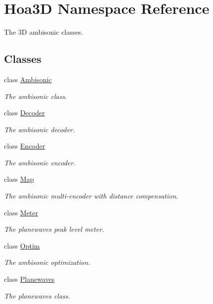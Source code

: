 \hypertarget{namespace_hoa3_d}{\section{Hoa3\-D Namespace Reference}
\label{namespace_hoa3_d}
}


The 3\-D ambisonic classes.  


\subsection*{Classes}
\begin{DoxyCompactItemize}
\item 
class \hyperlink{class_hoa3_d_1_1_ambisonic}{Ambisonic}
\begin{DoxyCompactList}\small\item\em The ambisonic class. \end{DoxyCompactList}\item 
class \hyperlink{class_hoa3_d_1_1_decoder}{Decoder}
\begin{DoxyCompactList}\small\item\em The ambisonic decoder. \end{DoxyCompactList}\item 
class \hyperlink{class_hoa3_d_1_1_encoder}{Encoder}
\begin{DoxyCompactList}\small\item\em The ambisonic encoder. \end{DoxyCompactList}\item 
class \hyperlink{class_hoa3_d_1_1_map}{Map}
\begin{DoxyCompactList}\small\item\em The ambisonic multi-\/encoder with distance compensation. \end{DoxyCompactList}\item 
class \hyperlink{class_hoa3_d_1_1_meter}{Meter}
\begin{DoxyCompactList}\small\item\em The planewaves peak level meter. \end{DoxyCompactList}\item 
class \hyperlink{class_hoa3_d_1_1_optim}{Optim}
\begin{DoxyCompactList}\small\item\em The ambisonic optimization. \end{DoxyCompactList}\item 
class \hyperlink{class_hoa3_d_1_1_planewaves}{Planewaves}
\begin{DoxyCompactList}\small\item\em The planewaves class. \end{DoxyCompactList}\item 

\end{DoxyCompactItemize}
